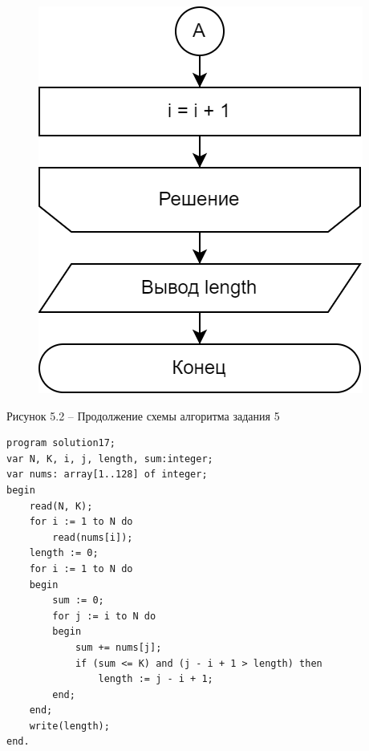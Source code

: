 \documentclass[a4paper,14pt]{extarticle}
\begin{document}
	\pagebreak
	\begin{figure}[h]
		\centering
		\includegraphics[width=0.25\linewidth]{schemes/s-5-2}
	\end{figure}
	\begin{center}
		Рисунок 5.2 – Продолжение схемы алгоритма задания 5
	\end{center}
	\begin{lstlisting}[tabsize=2,basicstyle=\ttfamily]
program solution17;
var N, K, i, j, length, sum:integer;
var nums: array[1..128] of integer;
begin
	read(N, K);
	for i := 1 to N do
		read(nums[i]);
	length := 0;
	for i := 1 to N do
	begin
		sum := 0;
		for j := i to N do
		begin
			sum += nums[j];
			if (sum <= K) and (j - i + 1 > length) then
				length := j - i + 1;
		end;
	end;
	write(length);
end.
	\end{lstlisting}
	
	\newpage
\end{document}
